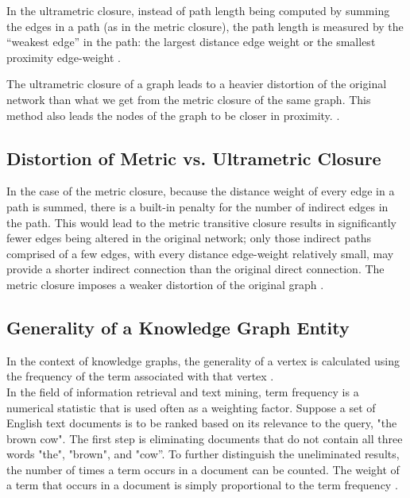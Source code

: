 \documentclass[10pt,11pt,12pt,oneside]{book}
\begin{document}
	 In the ultrametric closure, instead of path length being computed by summing the edges in a path (as in the metric closure), the path length is measured by the “weakest edge” in the path: the largest distance edge weight or the smallest proximity edge-weight \cite{SIMAS2015}.
	
	The ultrametric closure of a graph leads to a heavier distortion of the original network than what we get from the metric closure of the same graph. This method also leads the nodes of the graph to be closer in proximity. \cite{SIMAS2015}. 
	
	\subsection{Distortion of Metric vs. Ultrametric Closure}
	
	In the case of the metric closure, because the distance weight of every edge in a path is summed, there is a built-in penalty for the number of indirect edges in the path. This would lead to the metric transitive closure results in significantly fewer edges being altered in the original network; only those indirect paths comprised of a few edges, with every distance edge-weight relatively small, may
	provide a shorter indirect connection than the original direct connection. The metric closure imposes a weaker distortion of the original graph \cite{SIMAS2015}.
	
	\subsection{Generality of a Knowledge Graph Entity}
	In the context of knowledge graphs, the generality of a vertex is calculated using the frequency of the term associated with that vertex \cite{sutton2004collective}.\\
	
	In the field of information retrieval and text mining, term frequency is a numerical statistic that is used often as a weighting factor.  Suppose a set of English text documents is to be ranked based on its relevance to the query, "the brown cow". The first step is eliminating documents that do not contain all three words "the", "brown", and "cow”. To further distinguish the uneliminated results, the number of times a term occurs in a document can be counted. The weight of a term that occurs in a document is simply proportional to the term frequency \cite{lao2011random}.\\
	
\end{document}
